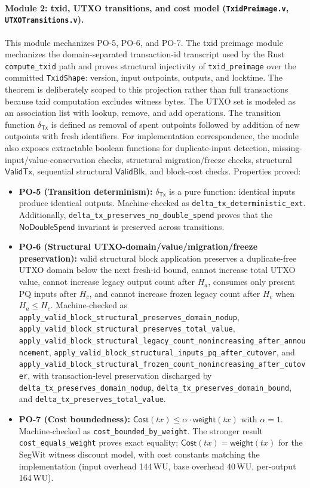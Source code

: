 \documentclass[11pt]{article}
\newcommand{\Tx}{\mathsf{Tx}}
\newcommand{\ValidTx}{\mathsf{ValidTx}}
\newcommand{\ValidBlk}{\mathsf{ValidBlk}}
\newcommand{\DeltaTx}{\delta_{\Tx}}
\newcommand{\Cost}{\mathsf{Cost}}
\newcommand{\weight}{\mathsf{weight}}
\begin{document}
\paragraph{Module 2: txid, UTXO transitions, and cost model (\texttt{TxidPreimage.v}, \texttt{UTXOTransitions.v}).}
This module mechanizes PO-5, PO-6, and PO-7.
The txid preimage module mechanizes the domain-separated transaction-id transcript used by the Rust \texttt{compute\_txid} path and proves structural injectivity of \texttt{txid\_preimage} over the committed \texttt{TxidShape}: version, input outpoints, outputs, and locktime.
The theorem is deliberately scoped to this projection rather than full transactions because txid computation excludes witness bytes.
The UTXO set is modeled as an association list with lookup, remove, and add operations.
The transition function $\DeltaTx$ is defined as removal of spent outpoints followed by addition of new outpoints with fresh identifiers.
For implementation correspondence, the module also exposes extractable boolean functions for duplicate-input detection, missing-input/value-conservation checks, structural migration/freeze checks, structural $\ValidTx$, sequential structural $\ValidBlk$, and block-cost checks.
Properties proved:

\begin{itemize}[leftmargin=2em]
  \item \textbf{PO-5 (Transition determinism):} $\DeltaTx$ is a pure function: identical inputs produce identical outputs.
  Machine-checked as \texttt{delta\_tx\_deterministic\_ext}.
  Additionally, \texttt{delta\_tx\_preserves\_no\_double\_spend} proves that the $\textsf{NoDoubleSpend}$ invariant is preserved across transitions.
  \item \textbf{PO-6 (Structural UTXO-domain/value/migration/freeze preservation):} valid structural block application preserves a duplicate-free UTXO domain below the next fresh-id bound, cannot increase total UTXO value, cannot increase legacy output count after $H_a$, consumes only present PQ inputs after $H_c$, and cannot increase frozen legacy count after $H_c$ when $H_a \le H_c$.
  Machine-checked as \texttt{apply\_valid\_block\_structural\_preserves\_domain\_nodup}, \texttt{apply\_valid\_block\_structural\_preserves\_total\_value}, \texttt{apply\_valid\_block\_structural\_legacy\_count\_nonincreasing\_after\_announcement}, \texttt{apply\_valid\_block\_structural\_inputs\_pq\_after\_cutover}, and \texttt{apply\_valid\_block\_structural\_frozen\_count\_nonincreasing\_after\_cutover}, with transaction-level preservation discharged by \texttt{delta\_tx\_preserves\_domain\_nodup}, \texttt{delta\_tx\_preserves\_domain\_bound}, and \texttt{delta\_tx\_preserves\_total\_value}.
  \item \textbf{PO-7 (Cost boundedness):} $\Cost(tx) \le \alpha \cdot \weight(tx)$ with $\alpha=1$.
  Machine-checked as \texttt{cost\_bounded\_by\_weight}.
  The stronger result \texttt{cost\_equals\_weight} proves exact equality: $\Cost(tx) = \weight(tx)$ for the SegWit witness discount model, with cost constants matching the implementation (input overhead 144\,WU, base overhead 40\,WU, per-output 164\,WU).
\end{itemize}
\end{document}
